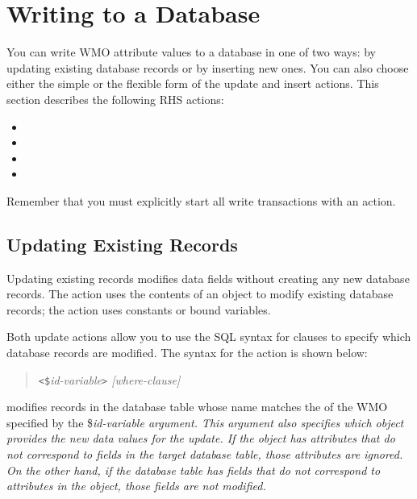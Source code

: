 \section{Writing to a Database}

You can write WMO attribute values to a database in one of two ways:
by updating existing database records or by inserting new ones. You
can also choose either the simple or the flexible form of the update
and insert actions. This section describes the following RHS actions:

\begin{itemize}
\item {}
\item {}
\item {}
\item {}
\end{itemize}

Remember that you must explicitly start all write transactions with an
 action.

\subsection{Updating Existing Records}

Updating existing records modifies data fields without creating any
new database records. The  action uses the
contents of an object to modify existing database records; the
 action uses constants or bound variables.

Both update actions allow you to use the SQL syntax for  clauses
to specify which database records are modified. The syntax for the
 action is shown below:

\begin{quote}
  \verb|<$|\it{id-variable}\verb|>| [\it{where-clause}]
\end{quote}

 modifies records in the database table
whose name matches the  of the WMO specified by the
\co\$\it{id-variable} argument. This argument also specifies which
object provides the new data values for the update. If the object has
attributes that do not correspond to fields in the target database
table, those attributes are ignored. On the other hand, if the
database table has fields that do not correspond to attributes in the
object, those fields are not modified.

